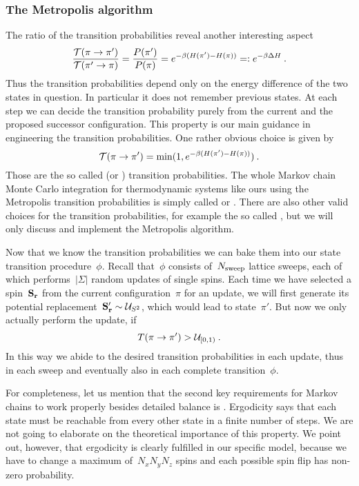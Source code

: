 \subsubsection{The Metropolis algorithm}

The ratio of the transition probabilities reveal another interesting
aspect
%
\begin{equation}
  \frac{\mathcal{T}(\pi \to \pi')}{\mathcal{T}(\pi' \to \pi)} = \frac{P(\pi')}{P(\pi)} =
  e^{-\beta (H(\pi') - H(\pi))} =: e^{-\beta \Delta H}\:.
\end{equation}
%
Thus the transition probabilities depend only on the energy difference of the
two states in question. In particular it does not remember previous states. At
each step we can decide  the transition probability purely from the current and
the proposed successor configuration. This property is our main guidance in
engineering the transition probabilities. One rather obvious choice is given by
%
\begin{equation}
  \mathcal{T}(\pi \to \pi') = \min(1, e^{-\beta (H(\pi') - H(\pi))})\:.
\end{equation}
%
Those are the so called  (or )
transition probabilities. The whole Markov chain Monte Carlo integration for
thermodynamic systems like ours using the Metropolis transition probabilities is
simply called  or . There are also other valid choices for the transition probabilities,
for example the so called , but we will only discuss
and implement the Metropolis algorithm.

Now that we know the transition probabilities we can bake them into our state
transition procedure~$\phi$. Recall that~$\phi$ consists of~$N_{\mathrm{sweep}}$ lattice
sweeps, each of which performs~$|\Sigma|$ random updates of single spins. Each
time we have selected a spin~$\mathbf{S}_{\mathbf{r}}$ from the current configuration~$\pi$ for
an update, we will first generate its potential replacement~$\mathbf{S}'_{\mathbf{r}} \sim
\mathcal{U}_{S^2}$, which would lead to state~$\pi'$. But now we only actually perform
the update, if
%
\begin{equation}
  T(\pi \to \pi') > \mathcal{U}_{[0,1)}\:.
\end{equation}
%
In this way we abide to the desired transition probabilities in each update,
thus in each sweep and eventually also in each complete transition~$\phi$.

For completeness, let us mention that the second key requirements for Markov
chains to work properly besides detailed balance is .
Ergodicity says that each state must be reachable from every other state in a
finite number of steps. We are not going to elaborate on the theoretical
importance of this property. We point out, however, that ergodicity is clearly
fulfilled in our specific model, because we have to change a maximum of~$N_x N_y
N_z$ spins and each possible spin flip has non-zero probability.

